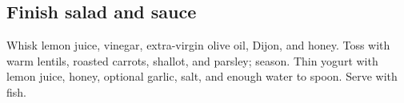 \begin{recipe}
\subsection{Finish salad and sauce}
Whisk lemon juice, vinegar, extra-virgin olive oil, Dijon, and honey. Toss with warm lentils, roasted carrots, shallot, and parsley; season. Thin yogurt with lemon juice, honey, optional garlic, salt, and enough water to spoon. Serve with fish.

\endgroup
\end{recipe}
